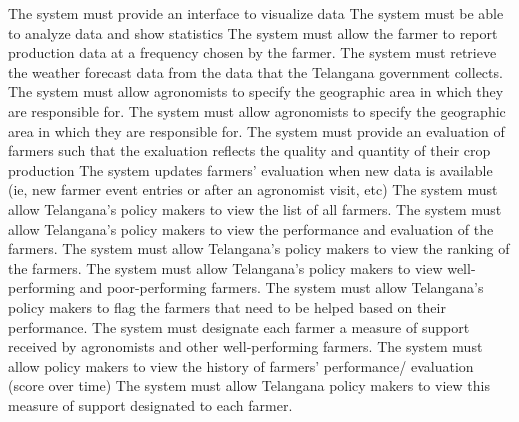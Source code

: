 \begin{itemize}
\begin{itemize}
 The system must provide an interface to visualize data
 The system must be able to analyze data and show statistics
 The system must allow the farmer to report production data at a frequency chosen by the farmer.
 The system must retrieve the weather forecast data from the data that the Telangana government collects.
 The system must allow agronomists to specify the geographic area in which they are responsible for.
 The system must allow agronomists to specify the geographic area in which they are responsible for.
  The system must provide an evaluation of farmers such that the exaluation reflects the quality and quantity of their crop production
  The system updates farmers' evaluation when new data is available (ie, new farmer event entries or after an agronomist visit, etc)
 The system must allow Telangana’s policy makers to view the list of all farmers.
 The system must allow Telangana’s policy makers to view the performance and evaluation of the farmers.
 The system must allow Telangana’s policy makers to view the ranking of the farmers.
 The system must allow Telangana’s policy makers to view well-performing and poor-performing farmers.
 The system must allow Telangana’s policy makers to flag the farmers that need to be helped based on their performance.
 The system must designate each farmer a measure of support received by agronomists and other well-performing farmers.
 The system must allow policy makers to view the history of farmers’ performance/ evaluation (score over time)
 The system must allow Telangana policy makers to view this measure of support designated to each farmer.
\end{itemize}



\end{itemize}
